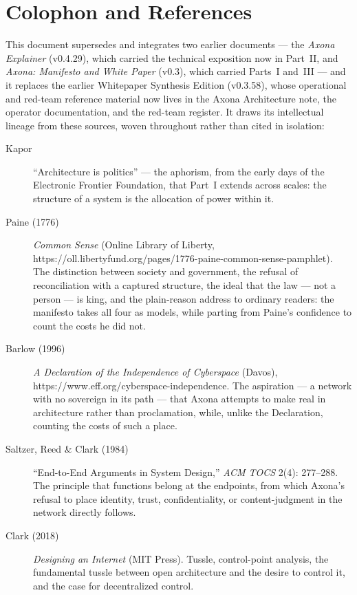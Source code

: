 \documentclass[nobib,justified]{tufte-handout}
\begin{document}
\section{Colophon and References}

This document supersedes and integrates two earlier documents --- the
\emph{Axona Explainer} (v0.4.29), which carried the technical exposition now
in Part~II, and \emph{Axona: Manifesto and White Paper} (v0.3), which carried
Parts~I and~III --- and it replaces the earlier Whitepaper Synthesis Edition
(v0.3.58), whose operational and red-team reference material now lives in the
Axona Architecture note, the operator documentation, and the red-team
register. It draws its intellectual lineage from these sources, woven
throughout rather than cited in isolation:

\begin{description}
\item[Kapor] ``Architecture is politics'' --- the aphorism, from the early
days of the Electronic Frontier Foundation, that Part~I extends across
scales: the structure of a system is the allocation of power within it.
\item[Paine (1776)] \emph{Common Sense} (Online Library of Liberty,
https://oll.libertyfund.org/pages/1776-paine-common-sense-pamphlet). The
distinction between society and government, the refusal of reconciliation with
a captured structure, the ideal that the law --- not a person --- is king, and
the plain-reason address to ordinary readers: the manifesto takes all four as
models, while parting from Paine's confidence to count the costs he did not.
\item[Barlow (1996)] \emph{A Declaration of the Independence of Cyberspace}
(Davos), https://www.eff.org/cyberspace-independence. The aspiration --- a
network with no sovereign in its path --- that Axona attempts to make real in
architecture rather than proclamation, while, unlike the Declaration,
counting the costs of such a place.
\item[Saltzer, Reed \& Clark (1984)] ``End-to-End Arguments in System Design,''
\emph{ACM TOCS} 2(4): 277--288. The principle that functions belong at the
endpoints, from which Axona's refusal to place identity, trust, confidentiality, or
content-judgment in the network directly follows.
\item[Clark (2018)] \emph{Designing an Internet} (MIT Press). Tussle,
control-point analysis, the fundamental tussle between open architecture and the
desire to control it, and the case for decentralized control.

\end{description}
\end{document}
